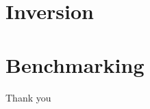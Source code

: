 \documentclass[aspectratio=169]{beamer}
\begin{document}
\section{Inversion}







\section{Benchmarking}




\begin{frame}
  \centering
  \vspace{2em}
  {\Large Thank you}\\[1em]
\end{frame}
\end{document}
